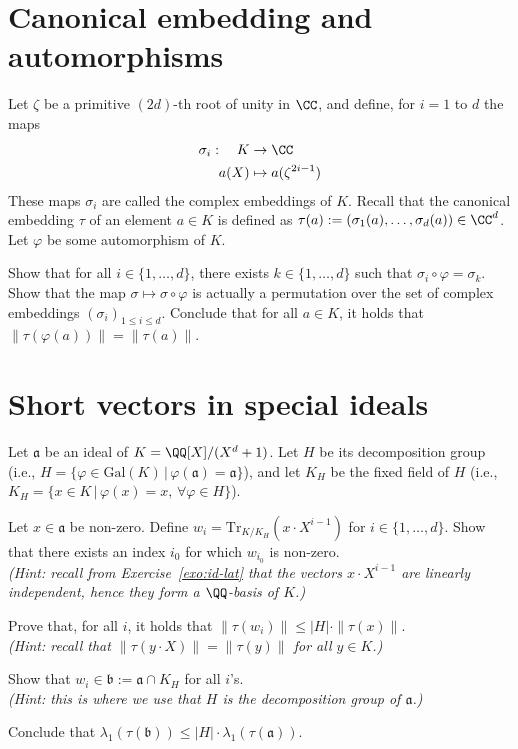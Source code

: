 \documentclass[11pt]{exam}
\theoremstyle{definition}
\begin{document}
\section{Canonical embedding and automorphisms}

Let $\zeta$ be a primitive $(2d)$-th root of unity in $\CC$, and define, for $i = 1$ to $d$ the maps
\begin{align*}
\sigma_i: \ \ \ K &\rightarrow \CC \\
a(X) & \mapsto a(\zeta^{2i-1})
\end{align*}
These maps $\sigma_i$ are called the complex embeddings of $K$.
Recall that the canonical embedding $\tau$ of an element $a \in K$ is defined as $\tau(a) := (\sigma_1(a), \dots, \sigma_d(a)) \in \CC^d$.
%
Let $\varphi$ be some automorphism of $K$.

\begin{questions}
\question Show that for all $i \in \{1, \dots, d\}$, there exists $k \in \{1, \dots, d\}$ such that $\sigma_i \circ \varphi = \sigma_k$.
\question Show that the map $\sigma \mapsto \sigma \circ \varphi$ is actually a permutation over the set of complex embeddings $(\sigma_i)_{1 \leq i \leq d}$.
\question Conclude that for all $a \in K$, it holds that $\|\tau(\varphi(a))\| = \|\tau(a)\|$.
\end{questions}

\section{Short vectors in special ideals}

Let $\mathfrak{a}$ be an ideal of $K = \QQ[X]/(X^d+1)$. Let $H$ be its decomposition group (i.e., $H = \{\varphi \in \mathrm{Gal}(K)\,|\, \varphi(\mathfrak{a}) = \mathfrak{a}\}$), and let $K_H$ be the fixed field of $H$ (i.e., $K_H = \{x \in K \,|\, \varphi(x) = x, \, \forall \varphi \in H\}$).

\begin{questions}
\question Let $x \in \mathfrak{a}$ be non-zero. Define $w_i = \mathrm{Tr}_{K/K_H}(x \cdot X^{i-1})$ for $i \in \{1, \dots, d\}$. Show that there exists an index $i_0$ for which $w_{i_0}$ is non-zero.\\
\textit{\color{gray}(Hint: recall from Exercise~\ref{exo:id-lat} that the vectors $x \cdot X^{i-1}$ are linearly independent, hence they form a $\QQ$-basis of $K$.)}

\question Prove that, for all $i$, it holds that $\|\tau(w_i)\| \leq |H| \cdot \|\tau(x)\|$.\\
\textit{\color{gray}(Hint: recall that $\|\tau(y \cdot X)\| = \|\tau(y)\|$ for all $y \in K$.)}

\question Show that $w_i \in \mathfrak{b} := \mathfrak{a} \cap K_H$ for all $i$'s.\\
\textit{\color{gray}(Hint: this is where we use that $H$ is the decomposition group of $\mathfrak{a}$.)}

\question Conclude that $\lambda_1(\tau(\mathfrak{b})) \leq |H| \cdot \lambda_1(\tau(\mathfrak{a}))$.
\end{questions}
\end{document}
